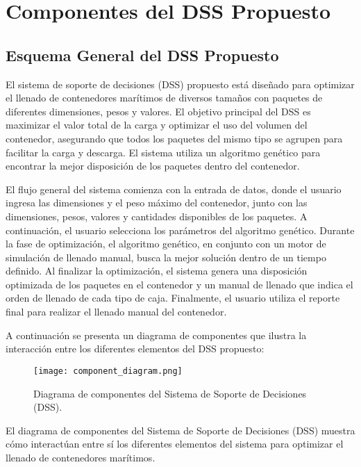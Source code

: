 \documentclass[9pt,a4paper]{rho}
\begin{document}
\section{Componentes del DSS Propuesto}

\subsection{Esquema General del DSS Propuesto}

El sistema de soporte de decisiones (DSS) propuesto está diseñado para optimizar el llenado de contenedores marítimos de diversos tamaños con paquetes de diferentes dimensiones, pesos y valores. El objetivo principal del DSS es maximizar el valor total de la carga y optimizar el uso del volumen del contenedor, asegurando que todos los paquetes del mismo tipo se agrupen para facilitar la carga y descarga. El sistema utiliza un algoritmo genético \cite{bortfeldt2001hybrid} para encontrar la mejor disposición de los paquetes dentro del contenedor.

El flujo general del sistema comienza con la entrada de datos, donde el usuario ingresa las dimensiones y el peso máximo del contenedor, junto con las dimensiones, pesos, valores y cantidades disponibles de los paquetes. A continuación, el usuario selecciona los parámetros del algoritmo genético. Durante la fase de optimización, el algoritmo genético, en conjunto con un motor de simulación de llenado manual, busca la mejor solución dentro de un tiempo definido. Al finalizar la optimización, el sistema genera una disposición optimizada de los paquetes en el contenedor y un manual de llenado que indica el orden de llenado de cada tipo de caja. Finalmente, el usuario utiliza el reporte final para realizar el llenado manual del contenedor.

A continuación se presenta un diagrama de componentes que ilustra la interacción entre los diferentes elementos del DSS propuesto:

\begin{figure}[h!]
    \centering
    \texttt{[image: component\_diagram.png]}
    \caption{Diagrama de componentes del Sistema de Soporte de Decisiones (DSS).}
    \label{fig:component_diagram}
\end{figure}

El diagrama de componentes del Sistema de Soporte de Decisiones (DSS) muestra cómo interactúan entre sí los diferentes elementos del sistema para optimizar el llenado de contenedores marítimos.
\end{document}
